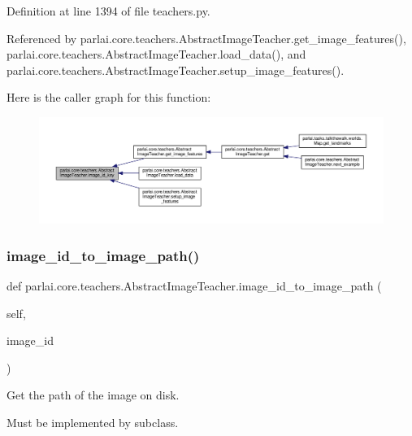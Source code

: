 Definition at line 1394 of file teachers.\+py.



Referenced by parlai.\+core.\+teachers.\+Abstract\+Image\+Teacher.\+get\+\_\+image\+\_\+features(), parlai.\+core.\+teachers.\+Abstract\+Image\+Teacher.\+load\+\_\+data(), and parlai.\+core.\+teachers.\+Abstract\+Image\+Teacher.\+setup\+\_\+image\+\_\+features().

Here is the caller graph for this function\+:
\nopagebreak
\begin{figure}[H]
\begin{center}
\leavevmode
\includegraphics[width=350pt]{classparlai_1_1core_1_1teachers_1_1AbstractImageTeacher_ada83f1832b7c75f9daab8e4d196ba893_icgraph}
\end{center}
\end{figure}
\mbox{\label{classparlai_1_1core_1_1teachers_1_1AbstractImageTeacher_aa75286450850638274d7f076a81f7e90}} 
\subsubsection{\texorpdfstring{image\+\_\+id\+\_\+to\+\_\+image\+\_\+path()}{image\_id\_to\_image\_path()}}
{\footnotesize\ttfamily def parlai.\+core.\+teachers.\+Abstract\+Image\+Teacher.\+image\+\_\+id\+\_\+to\+\_\+image\+\_\+path (\begin{DoxyParamCaption}\item[{}]{self,  }\item[{}]{image\+\_\+id }\end{DoxyParamCaption})}

\begin{DoxyVerb}Get the path of the image on disk.

Must be implemented by subclass.
\end{DoxyVerb}
 

